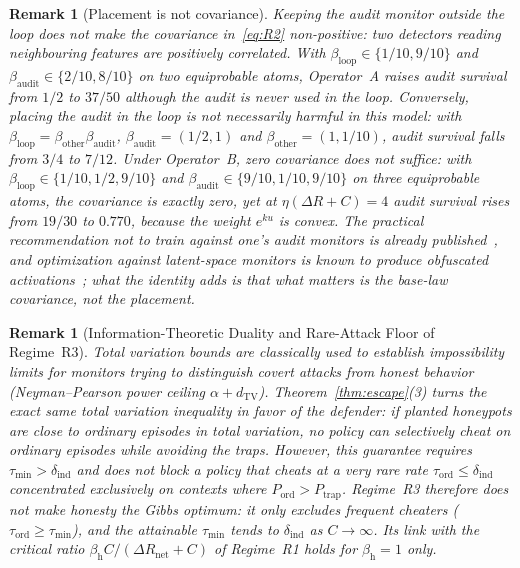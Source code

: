 \documentclass[11pt,a4paper]{article}
\newtheorem{remark}[theorem]{Remark}
\newcommand{\dTV}{d_{\mathrm{TV}}}
\begin{document}
\begin{remark}[Placement is not covariance]\label{rem:decoupling}
Keeping the audit monitor outside the loop does not make the covariance in~\eqref{eq:R2} non-positive: two detectors reading neighbouring features are positively correlated. With $\beta_{\mathrm{loop}} \in \{1/10, 9/10\}$ and $\beta_{\mathrm{audit}} \in \{2/10, 8/10\}$ on two equiprobable atoms, Operator~A raises audit survival from $1/2$ to $37/50$ although the audit is never used in the loop. Conversely, placing the audit in the loop is not necessarily harmful in this model: with $\beta_{\mathrm{loop}} = \beta_{\mathrm{other}}\beta_{\mathrm{audit}}$, $\beta_{\mathrm{audit}} = (1/2, 1)$ and $\beta_{\mathrm{other}} = (1, 1/10)$, audit survival falls from $3/4$ to $7/12$. Under Operator~B, zero covariance does not suffice: with $\beta_{\mathrm{loop}} \in \{1/10, 1/2, 9/10\}$ and $\beta_{\mathrm{audit}} \in \{9/10, 1/10, 9/10\}$ on three equiprobable atoms, the covariance is exactly zero, yet at $\eta(\Delta R + C) = 4$ audit survival rises from $19/30$ to $0.770$, because the weight $e^{ku}$ is convex. The practical recommendation not to train against one's audit monitors is already published~\cite{baker2025,korbak2025}, and optimization against latent-space monitors is known to produce obfuscated activations~\cite{bailey2024}; what the identity adds is that what matters is the base-law covariance, not the placement.
\end{remark}

\begin{remark}[Information-Theoretic Duality and Rare-Attack Floor of Regime~R3]
Total variation bounds are classically used to establish impossibility limits for \emph{monitors} trying to distinguish covert attacks from honest behavior (Neyman--Pearson power ceiling $\alpha + \dTV$). Theorem~\ref{thm:escape}(3) turns the exact same total variation inequality in favor of the \emph{defender}: if planted honeypots are close to ordinary episodes in total variation, no policy can selectively cheat on ordinary episodes while avoiding the traps. However, this guarantee requires $\tau_{\min} > \delta_{\mathrm{ind}}$ and does not block a policy that cheats at a very rare rate $\tau_{\mathrm{ord}} \le \delta_{\mathrm{ind}}$ concentrated exclusively on contexts where $P_{\mathrm{ord}} > P_{\mathrm{trap}}$. Regime~R3 therefore does not make honesty the Gibbs optimum: it only excludes frequent cheaters ($\tau_{\mathrm{ord}} \ge \tau_{\min}$), and the attainable $\tau_{\min}$ tends to $\delta_{\mathrm{ind}}$ as $C \to \infty$. Its link with the critical ratio $\beta_{\mathrm{h}}C/(\Delta R_{\mathrm{net}} + C)$ of Regime~R1 holds for $\beta_{\mathrm{h}} = 1$ only.
\end{remark}
\end{document}
